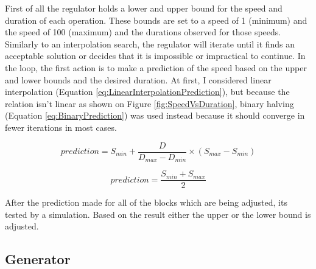 
First of all the regulator holds a lower and upper bound for the speed and duration of each operation. These bounds are set to a speed of 1 (minimum) and the speed of 100 (maximum) and the durations observed for those speeds. Similarly to an interpolation search, the regulator will iterate until it finds an acceptable solution or decides that it is impossible or impractical to continue. In the loop, the first action is to make a prediction of the speed based on the upper and lower bounds and the desired duration. At first, I considered linear interpolation (Equation \ref{eq:LinearInterpolationPrediction}), but because the relation isn't linear as shown on Figure \ref{fig:SpeedVsDuration}, binary halving (Equation \ref{eq:BinaryPrediction}) was used instead because it should converge in fewer iterations in most cases.

\begin{equation} \label{eq:LinearInterpolationPrediction}
    prediction = S_{min} + \frac{D}{D_{max}-D_{min}} \times (S_{max}-S_{min})
\end{equation}

\begin{equation} \label{eq:BinaryPrediction}
    prediction = \frac{S_{min} + S_{max}}{2}
\end{equation}

After the prediction made for all of the blocks which are being adjusted, its tested by a simulation. Based on the result either the upper or the lower bound is adjusted. 


\subsection{Generator}

